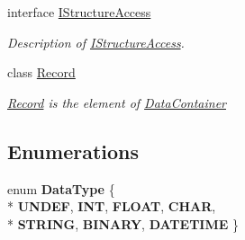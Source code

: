 \begin{DoxyCompactItemize}
interface \hyperlink{interface_dwarf_d_b_1_1_data_structures_1_1_i_structure_access}{I\+Structure\+Access}
\begin{DoxyCompactList}\small\item\em Description of \hyperlink{interface_dwarf_d_b_1_1_data_structures_1_1_i_structure_access}{I\+Structure\+Access}. \end{DoxyCompactList}\item 
class \hyperlink{class_dwarf_d_b_1_1_data_structures_1_1_record}{Record}
\begin{DoxyCompactList}\small\item\em \hyperlink{class_dwarf_d_b_1_1_data_structures_1_1_record}{Record} is the element of \hyperlink{class_dwarf_d_b_1_1_data_structures_1_1_data_container}{Data\+Container} \end{DoxyCompactList}\end{DoxyCompactItemize}
\subsection*{Enumerations}
\begin{DoxyCompactItemize}
\item 
\hypertarget{namespace_dwarf_d_b_1_1_data_structures_addb5abc91c4c09e6f8d87456bb41ef82}{enum {\bfseries Data\+Type} \{ \\*
{\bfseries U\+N\+D\+E\+F}, 
{\bfseries I\+N\+T}, 
{\bfseries F\+L\+O\+A\+T}, 
{\bfseries C\+H\+A\+R}, 
\\*
{\bfseries S\+T\+R\+I\+N\+G}, 
{\bfseries B\+I\+N\+A\+R\+Y}, 
{\bfseries D\+A\+T\+E\+T\+I\+M\+E}
 \}}\label{namespace_dwarf_d_b_1_1_data_structures_addb5abc91c4c09e6f8d87456bb41ef82}

\end{DoxyCompactItemize}
